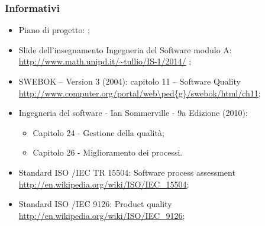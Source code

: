 \subsubsection{Informativi}
\begin{itemize}
\item Piano di progetto: \href{run:../../Esterni/\fPianoDiProgetto}{\fEscapePianoDiProgetto};
\item Slide dell’insegnamento Ingegneria del Software modulo A:\\
\url{http://www.math.unipd.it/~tullio/IS-1/2014/} ;
\item SWEBOK – Version 3 (2004): capitolo 11 – Software Quality\\
\url{http://www.computer.org/portal/web\ped{g}/swebok/html/ch11};
\item Ingegneria del software - Ian Sommerville - 9a Edizione (2010):
\begin{itemize}
	\item Capitolo 24 - Gestione della qualità;
	\item Capitolo 26 - Miglioramento dei processi.
\end{itemize}
\item Standard ISO /IEC TR 15504: Software process assessment\\ \url{http://en.wikipedia.org/wiki/ISO/IEC_15504};
\item Standard ISO /IEC 9126: Product quality\\ \url{http://en.wikipedia.org/wiki/ISO/IEC_9126};
\end{itemize}
